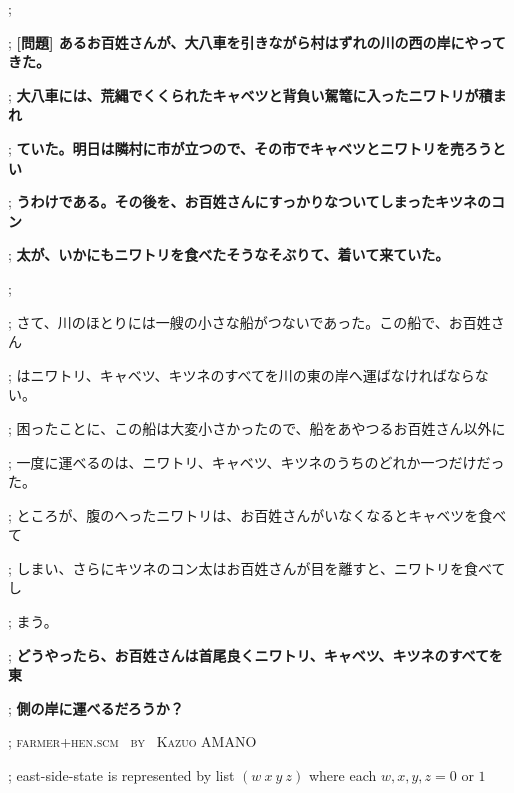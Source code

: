 \documentclass[a4paper,10pt]{article}
\def\mc{\relax}
\def\sc{\scshape}
\begin{document}
\tt\mc 

\noindent
\mbox{}\rm\mc {\tt ;}; \hrulefill
\tt\mc 

\noindent
\mbox{}\rm\mc {\tt ;}; \bf [問題] あるお百姓さんが、大八車を引きながら村はずれの川の西の岸にやってきた。
\tt\mc 

\noindent
\mbox{}\rm\mc {\tt ;}; \bf 大八車には、荒縄でくくられたキャベツと背負い駕篭に入ったニワトリが積まれ
\tt\mc 

\noindent
\mbox{}\rm\mc {\tt ;}; \bf ていた。明日は隣村に市が立つので、その市でキャベツとニワトリを売ろうとい
\tt\mc 

\noindent
\mbox{}\rm\mc {\tt ;}; \bf うわけである。その後を、お百姓さんにすっかりなついてしまったキツネのコン
\tt\mc 

\noindent
\mbox{}\rm\mc {\tt ;}; \bf 太が、いかにもニワトリを食べたそうなそぶりて、着いて来ていた。
\tt\mc 

\noindent
\mbox{}\rm\mc {\tt ;};
\tt\mc 

\noindent
\mbox{}\rm\mc {\tt ;}; さて、川のほとりには一艘の小さな船がつないであった。この船で、お百姓さん
\tt\mc 

\noindent
\mbox{}\rm\mc {\tt ;}; はニワトリ、キャベツ、キツネのすべてを川の東の岸へ運ばなければならない。
\tt\mc 

\noindent
\mbox{}\rm\mc {\tt ;}; 困ったことに、この船は大変小さかったので、船をあやつるお百姓さん以外に
\tt\mc 

\noindent
\mbox{}\rm\mc {\tt ;}; 一度に運べるのは、ニワトリ、キャベツ、キツネのうちのどれか一つだけだった。
\tt\mc 

\noindent
\mbox{}\rm\mc {\tt ;}; ところが、腹のへったニワトリは、お百姓さんがいなくなるとキャベツを食べて
\tt\mc 

\noindent
\mbox{}\rm\mc {\tt ;}; しまい、さらにキツネのコン太はお百姓さんが目を離すと、ニワトリを食べてし
\tt\mc 

\noindent
\mbox{}\rm\mc {\tt ;}; まう。
\tt\mc 

\noindent
\mbox{}\rm\mc {\tt ;}; \bf どうやったら、お百姓さんは首尾良くニワトリ、キャベツ、キツネのすべてを東
\tt\mc 

\noindent
\mbox{}\rm\mc {\tt ;}; \bf 側の岸に運べるだろうか？
\tt\mc 

\noindent
\mbox{}\hfill

\noindent
\mbox{}\rm\mc {\tt ;}; \sc farmer+hen.scm \ by \ Kazuo AMANO
\tt\mc 

\noindent
\mbox{}\rm\mc {\tt ;}; east-side-state is represented by list $(w\ x\ y\ z)$ where each $w, x, y, z = 0$ or $1$
\tt\mc 
\end{document}
